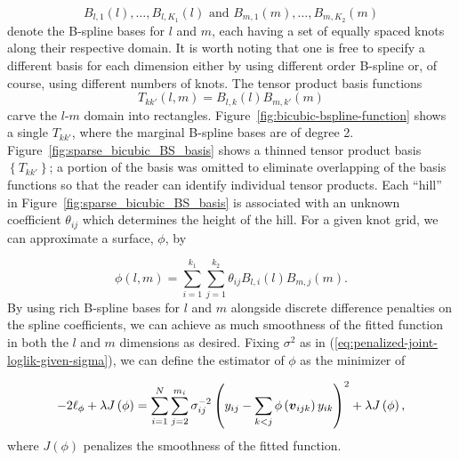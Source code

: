 \[
B_{l,1}\left(l\right),\dots, B_{l,K_1}\left(l\right)  \mbox{ and } B_{m,1}\left(m\right),\dots, B_{m,K_2}\left(m\right)
\]
\noindent
denote the B-spline bases for $l$ and $m$, each having a set of equally spaced knots along their respective domain. It is worth noting that one is free to specify a different basis for each dimension either by using different order B-spline or, of course, using different numbers of knots. The tensor product basis functions
\begin{equation*}
T_{kk'}\left(l,m\right) = B_{l,k}\left(l\right){B}_{m,k'}\left(m\right)
\end{equation*}
\noindent
carve the $l$-$m$ domain into rectangles. Figure~\ref{fig:bicubic-bspline-function} shows a single $T_{kk'}$, where the marginal B-spline bases are of degree 2. Figure~\ref{fig:sparse_bicubic_BS_basis} shows a thinned tensor product basis $\left\{ T_{kk'} \right\}$; a portion of the basis was omitted to eliminate overlapping of the basis functions so that the reader can identify individual tensor products. Each ``hill'' in Figure~\ref{fig:sparse_bicubic_BS_basis} is associated with an unknown coefficient $\theta_{ij}$ which determines the height of the hill. For a given knot grid, we can approximate a surface, $\phi$, by

\begin{equation} \label{eq:tensor-product-bspline-expansion-phi}
\phi\left(l,m\right) = \sum_{i=1}^{k_1} \sum_{j=1}^{k_2} \theta_{ij} B_{l,i}\left(l\right) B_{m,j}\left(m\right). 
\end{equation}
\noindent
 By using rich B-spline bases for $l$ and $m$ alongside discrete difference penalties on the spline coefficients, we can achieve as much smoothness of the fitted function in both the $l$ and $m$ dimensions as desired. Fixing $\sigma^2$ as in (\ref{eq:penalized-joint-loglik-given-sigma}), we can define the estimator of $\phi$ as the minimizer of

\begin{equation} 
-2\ell_\phi + \lambda J\left(\phi\right) = \sum_{i=1}^N \sum_{j=2}^{m_i} \sigma^{-2}_{ij}\left( y_{ij} - \sum_{k<j} \phi\left(\mbox{\boldmath $v$}_{ijk}\right) y_{ik}  \right)^2 + \lambda J\left( \phi \right),
\end{equation} 
\noindent
where $J\left(\phi\right)$ penalizes the smoothness of the fitted function. 


